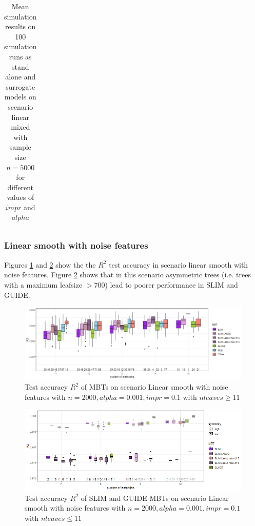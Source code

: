 \begin{table}[!htb]
\begin{tabular}[t]{l|l|r|r|r|r|r|r|r|r|r}
\end{tabular}
\caption{Mean simulation results on 100 simulation runs as stand alone and surrogate models on scenario linear mixed with sample size $n = 5000$ for different values of $impr$ and $alpha$}
\label{tab:app_linear_mixed_5000}

\end{table}


\clearpage

\subsubsection{Linear smooth with noise features}
Figures \ref{fig:app_lasso_standalone_r2_test} and \ref{fig:app_lasso_standalone_r2_test_slim} show the the $R^2$ test accuracy in scenario linear smooth with noise features. Figure \ref{fig:app_lasso_standalone_r2_test_slim} shows that in this scenario asymmetric trees (i.e. trees with a maximum leafsize $> 700$) lead to poorer performance in SLIM and GUIDE.


\begin{figure}[!htb]
     \centering
     
    \includegraphics[width=16cm]{Figures/simulations/chapter_5_simulation_study/lasso/lasso_standalone_r2_test.png}
    \caption{Test accuracy $R^2$ of MBTs on scenario Linear smooth with noise features with $n=2000, alpha = 0.001, impr = 0.1$ with $n leaves \geq 11$}
    \label{fig:app_lasso_standalone_r2_test}
\end{figure} 

\begin{figure}[!htb]
     \centering
    \includegraphics[width=16cm]{Figures/simulations/chapter_5_simulation_study/lasso/lasso_standalone_r2_test_slim.png}
    \caption{Test accuracy $R^2$ of SLIM and GUIDE MBTs on scenario Linear smooth with noise features with $n=2000, alpha = 0.001, impr = 0.1$ with $n leaves \leq 11$}
\label{fig:app_lasso_standalone_r2_test_slim}
\end{figure} 

